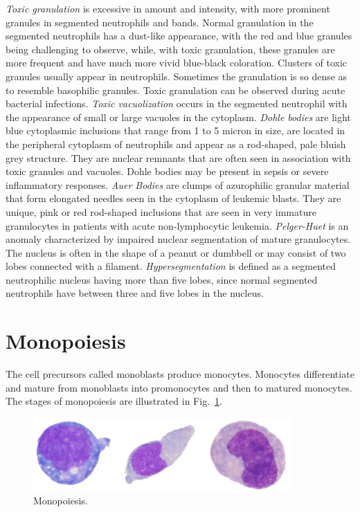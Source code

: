 \textit{Toxic granulation} is excessive in amount and intensity, with more prominent granules in segmented neutrophils and bands. Normal granulation in the segmented neutrophils has a dust-like appearance, with the red and blue granules being challenging to observe, while, with toxic granulation, these granules are more frequent and have much more vivid blue-black coloration. Clusters of toxic granules usually appear in neutrophils. Sometimes the granulation is so dense as to resemble basophilic granules. Toxic granulation can be observed during acute bacterial infections. \textit{Toxic vacuolization} occurs in the segmented neutrophil with the appearance of small or large vacuoles in the cytoplasm. \textit{Dohle bodies} are light blue cytoplasmic inclusions that range from 1 to 5 micron in size, are located in the peripheral cytoplasm of neutrophils and appear as a rod-shaped, pale bluish grey structure. They are nuclear remnants that are often seen in association with toxic granules and vacuoles. Dohle bodies may be present in sepsis or severe inflammatory responses. \textit{Auer Bodies} are clumps of azurophilic granular material that form elongated needles seen in the cytoplasm of leukemic blasts. They are unique, pink or red rod-shaped inclusions that are seen in very immature granulocytes in patients with acute non-lymphocytic leukemia. \textit{Pelger-Huet} is an anomaly characterized by impaired nuclear segmentation of mature granulocytes. The nucleus is often in the shape of a peanut or dumbbell or may consist of two lobes connected with a filament. \textit{Hypersegmentation} is defined as a segmented neutrophilic nucleus having more than five lobes, since normal segmented neutrophils have between three and five lobes in the nucleus. 

\section{Monopoiesis}
The cell precursors called monoblasts produce monocytes. Monocytes differentiate and mature from monoblasts into promonocytes and then to matured monocytes. The stages of monopoiesis are illustrated in Fig.~\ref{fig:Monopoiesis}.

\begin{figure}[!htbp]
	\centering
	\includegraphics[width=0.88\textwidth]{images/monopoiesis}
	\caption{\label{fig:Monopoiesis} Monopoiesis.}
\end{figure}

